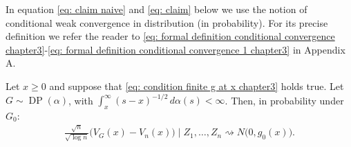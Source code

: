 In equation \eqref{eq: claim naive} and \eqref{eq: claim} below we use the notion of conditional weak convergence in distribution (in probability). For its precise definition we refer the reader to \eqref{eq: formal definition conditional convergence chapter3}-\eqref{eq: formal definition conditional convergence 1 chapter3} in Appendix A.
\begin{theorem}\label{thm: BvM naive}
	Let $x \geq 0$ and suppose that \eqref{eq: condition finite g at x chapter3} holds true. Let $G \sim \operatorname{DP}(\alpha)$, with $\int_{x}^{\infty} (s-x)^{-1/2} \, d \alpha(s) < \infty$. Then, in probability under $G_0$: 
	\begin{align}\label{eq: claim naive}
	\frac{\sqrt{n}}{\sqrt{\log n}}\big( V_{\scriptscriptstyle{G}}(x)-V_n(x)\big) \mid Z_1, \ldots, Z_n \rightsquigarrow N\big(0, g_0(x)\big).
	\end{align}
\end{theorem}
